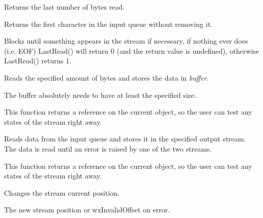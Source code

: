 
Returns the last number of bytes read.

\label{wxinputstreampeek}


Returns the first character in the input queue without removing it.


Blocks until something appears in the stream if necessary, if nothing
ever does (i.e. EOF) LastRead() will return 0 (and the return value is
undefined), otherwise LastRead() returns 1.

\label{wxinputstreamread}


Reads the specified amount of bytes and stores the data in {\it buffer}.


The buffer absolutely needs to have at least the specified size.


This function returns a reference on the current object, so the user can test
any states of the stream right away.


Reads data from the input queue and stores it in the specified output stream.
The data is read until an error is raised by one of the two streams.


This function returns a reference on the current object, so the user can test
any states of the stream right away.

\label{wxinputstreamseeki}


Changes the stream current position.





The new stream position or wxInvalidOffset on error.

